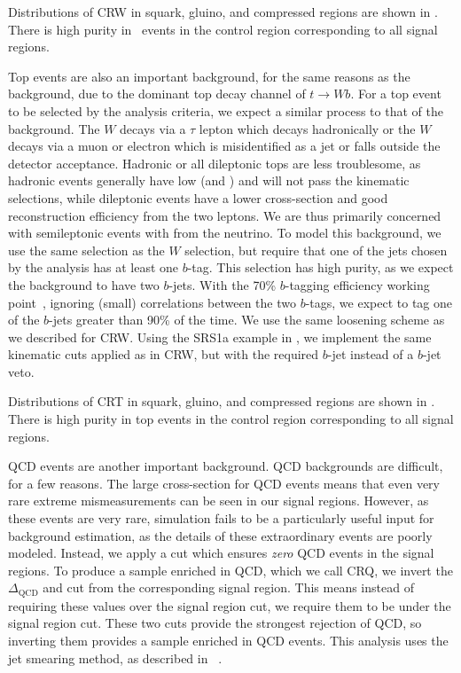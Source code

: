 Distributions of CRW in squark, gluino, and compressed regions are shown in .
There is high purity in \wjets~events in the control region corresponding to all signal regions.

Top events are also an important background, for the same reasons as the \wjets~ background, due to the dominant top decay channel of $t \rightarrow Wb$.
For a top event to be selected by the analysis criteria, we expect a similar process to that of the \wjets background.
The $W$ decays via a $\tau$ lepton which decays hadronically or the $W$ decays via a muon or electron which is misidentified as a jet or falls outside the detector acceptance.
Hadronic or all dileptonic tops are less troublesome, as hadronic \ttbar events generally have low \met (and ) and will not pass the kinematic selections, while dileptonic \ttbar events have a lower cross-section and good reconstruction efficiency from the two leptons.
We are thus primarily concerned with semileptonic \ttbar events with \met from the neutrino.
To model this background, we use the same selection as the $W$ selection, but require that one of the jets chosen by the analysis has at least one $b$-tag.
This selection has high purity, as we expect the \ttbar background to have two $b$-jets.
With the 70\% $b$-tagging efficiency working point~\cite{Aad:2015ydr,ATL-PHYS-PUB-2016-012}, ignoring (small) correlations between the two $b$-tags, we expect to tag one of the $b$-jets greater than 90\% of the time.
We use the same loosening scheme as we described for CRW.
Using the SRS1a example in , we implement the same kinematic cuts applied as in CRW, but with the required $b$-jet instead of a $b$-jet veto.

Distributions of CRT in squark, gluino, and compressed regions are shown in .
There is high purity in top events in the control region corresponding to all signal regions.

QCD events are another important background.
QCD backgrounds are difficult, for a few reasons.
The large cross-section for QCD events means that even very rare extreme mismeasurements can be seen in our signal regions.
However, as these events are very rare, simulation fails to be a particularly useful input for background estimation, as the details of these extraordinary events are poorly modeled.
Instead, we apply a cut which ensures \textit{zero} QCD events in the signal regions.
To produce a sample enriched in QCD, which we call CRQ, we invert the $\Delta_{\mathrm{QCD}}$ and  cut from the corresponding signal region.
This means instead of requiring these values over the signal region cut, we require them to be under the signal region cut.
These two cuts provide the strongest rejection of QCD, so inverting them provides a sample enriched in QCD events.
This analysis uses the jet smearing method, as described in ~\cite{SUSY-2011-20}.

